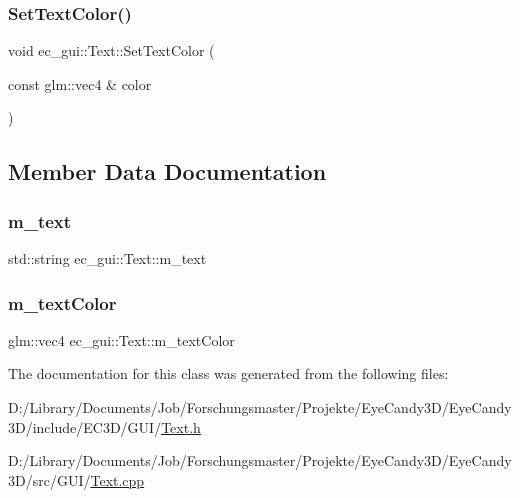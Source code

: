 \mbox{\label{classec__gui_1_1_text_ae8f42c56d9a07b455d4a1643a5586671}} 
\subsubsection{\texorpdfstring{Set\+Text\+Color()}{SetTextColor()}}
{\footnotesize\ttfamily void ec\+\_\+gui\+::\+Text\+::\+Set\+Text\+Color (\begin{DoxyParamCaption}\item[{const glm\+::vec4 \&}]{color }\end{DoxyParamCaption})}



\subsection{Member Data Documentation}
\mbox{\label{classec__gui_1_1_text_a97780a155cc50f0d83fe5149e006b938}} 
\subsubsection{\texorpdfstring{m\+\_\+text}{m\_text}}
{\footnotesize\ttfamily std\+::string ec\+\_\+gui\+::\+Text\+::m\+\_\+text\hspace{0.3cm}{\ttfamily [protected]}}

\mbox{\label{classec__gui_1_1_text_af90729dfed09a3c4c94ed03e5769001e}} 
\subsubsection{\texorpdfstring{m\+\_\+text\+Color}{m\_textColor}}
{\footnotesize\ttfamily glm\+::vec4 ec\+\_\+gui\+::\+Text\+::m\+\_\+text\+Color\hspace{0.3cm}{\ttfamily [protected]}}



The documentation for this class was generated from the following files\+:\begin{DoxyCompactItemize}
\item 
D\+:/\+Library/\+Documents/\+Job/\+Forschungsmaster/\+Projekte/\+Eye\+Candy3\+D/\+Eye\+Candy3\+D/include/\+E\+C3\+D/\+G\+U\+I/\mbox{\hyperlink{_text_8h}{Text.\+h}}\item 
D\+:/\+Library/\+Documents/\+Job/\+Forschungsmaster/\+Projekte/\+Eye\+Candy3\+D/\+Eye\+Candy3\+D/src/\+G\+U\+I/\mbox{\hyperlink{_text_8cpp}{Text.\+cpp}}\end{DoxyCompactItemize}
